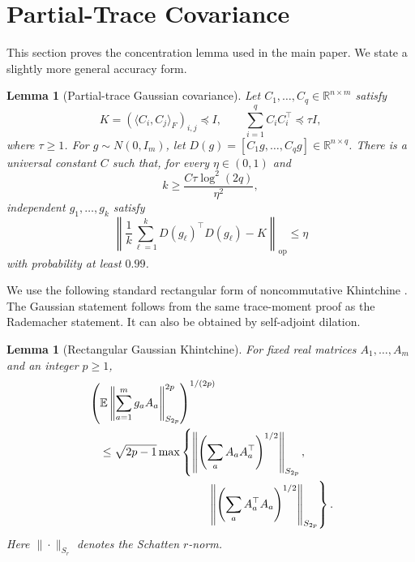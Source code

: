 \documentclass[twoside]{article}
\newtheorem{lemma}[theorem]{Lemma}
\newcommand{\E}{\mathbb E}
\newcommand{\R}{\mathbb R}
\newcommand{\op}{\mathrm{op}}
\begin{document}
\runningauthor{}

\onecolumn
{}



\appendix

\section{Partial-Trace Covariance}
\label{app:covariance}

This section proves the concentration lemma used in the main paper. We state
a slightly more general accuracy form.

\begin{lemma}[Partial-trace Gaussian covariance]
\label{lem:app-covariance}
Let $C_1,\ldots,C_q\in\R^{n\times m}$ satisfy
\begin{equation}
 K=(\langle C_i,C_j\rangle_F)_{i,j}\preceq I,
 \qquad
 \sum_{i=1}^qC_iC_i^\top\preceq\tau I,
 \label{eq:app-assumptions}
\end{equation}
where $\tau\ge1$. For $g\sim N(0,I_m)$, let
$D(g)=[C_1g,\ldots,C_qg]\in\R^{n\times q}$. There is a universal constant
$C$ such that, for every $\eta\in(0,1)$ and
\begin{equation}
 k\ge \frac{C\tau\log^2(2q)}{\eta^2},
 \label{eq:app-k}
\end{equation}
independent $g_1,\ldots,g_k$ satisfy
\begin{equation}
 \left\|\frac1k\sum_{\ell=1}^k
 D(g_\ell)^\top D(g_\ell)-K\right\|_\op\le\eta
 \label{eq:app-conclusion}
\end{equation}
with probability at least $0.99$.
\end{lemma}

We use the following standard rectangular form of noncommutative Khintchine
\citep{buchholz2001operator}. The Gaussian statement follows from the same
trace-moment proof as the Rademacher statement. It can also be obtained by
self-adjoint dilation.

\begin{lemma}[Rectangular Gaussian Khintchine]
\label{lem:nck}
For fixed real matrices $A_1,\ldots,A_m$ and an integer $p\ge1$,
\begin{align}
 &\left(\E\left\|\sum_{a=1}^m g_aA_a\right\|_{S_{2p}}^{2p}
 \right)^{1/(2p)}\notag\\
 &\quad\le \sqrt{2p-1}\max\left\{
 \left\|\left(\sum_aA_aA_a^\top\right)^{1/2}\right\|_{S_{2p}},\right.\notag\\
 &\hspace{105pt}\left.\left\|\left(\sum_aA_a^\top A_a\right)^{1/2}
 \right\|_{S_{2p}}\right\}.
 \label{eq:nck}
\end{align}
Here $\|\cdot\|_{S_r}$ denotes the Schatten $r$-norm.
\end{lemma}
\end{document}
